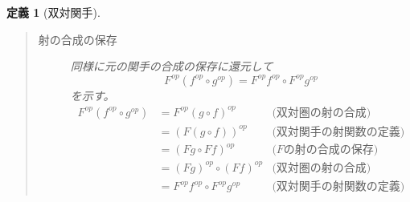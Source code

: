 \documentclass[uplatex,dvipdfmx]{jsarticle}
\newtheorem{define}{定義}[section]
\numberwithin{proof}{subsection}
\numberwithin{prop}{subsection}
\numberwithin{define}{subsection}
\begin{document}
\begin{define}[双対関手]
\begin{quote}
\begin{description}
				\item[射の合成の保存]同様に元の関手の合成の保存に還元して\[F^{op}(f^{op}\circ g^{op})=F^{op}f^{op}\circ F^{op}g^{op}\]を示す。
				\begin{align*}
					F^{op}(f^{op}\circ g^{op})&= F^{op}(g\circ f)^{op}&\text{(双対圏の射の合成)}\\
					&=(F(g\circ f))^{op}&\text{(双対関手の射関数の定義)}\\
					&=(Fg\circ Ff)^{op}&\text{($F$の射の合成の保存)}\\
					&=(Fg)^{op}\circ (Ff)^{op}&\text{(双対圏の射の合成)}\\
					&=F^{op}f^{op}\circ F^{op}g^{op}&\text{(双対関手の射関数の定義)}
				\end{align*}
			\end{description}
		\end{quote}
	\end{define}
\end{document}
